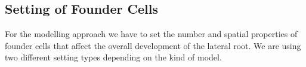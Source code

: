 \documentclass[11pt,a4paper, final]{article}
\begin{document}
\subsection{Setting of Founder Cells}
\noindent
For the modelling approach we have to set the number and spatial properties of founder cells that affect the overall development of the lateral root. We are using two different setting types depending on the kind of model.

\end{document}
